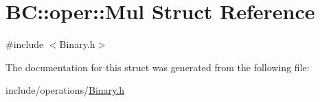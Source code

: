 \hypertarget{structBC_1_1oper_1_1Mul}{}\section{BC\+:\+:oper\+:\+:Mul Struct Reference}
\label{structBC_1_1oper_1_1Mul}


{\ttfamily \#include $<$Binary.\+h$>$}



The documentation for this struct was generated from the following file\+:\begin{DoxyCompactItemize}
\item 
include/operations/\hyperlink{Binary_8h}{Binary.\+h}\end{DoxyCompactItemize}
